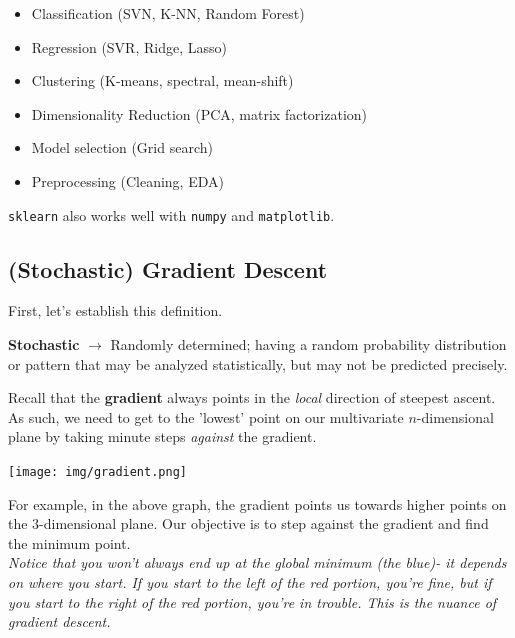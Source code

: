 \documentclass[english, 10pt]{article}
\begin{document}
\begin{itemize}
	\item Classification (SVN, K-NN, Random Forest)
	\item Regression (SVR, Ridge, Lasso)
	\item Clustering (K-means, spectral, mean-shift)
	\item Dimensionality Reduction (PCA, matrix factorization)
	\item Model selection (Grid search)
	\item Preprocessing (Cleaning, EDA)
\end{itemize}

\texttt{sklearn} also works well with \texttt{numpy} and \texttt{matplotlib}.

\subsection{(Stochastic) Gradient Descent}

First, let's establish this definition.\\

\begin{tcolorbox}[title=Definition:,colframe=red!75!black,colback=red!5!white,arc=0pt,fonttitle=\bfseries]
\textbf{Stochastic} $\rightarrow$ Randomly determined; having a random probability distribution or pattern that may be analyzed statistically, but may not be predicted precisely.
\end{tcolorbox}

\hfill \break Recall that the \textbf{gradient} always points in the \textit{local} direction of steepest ascent.\\

As such, we need to get to the 'lowest' point on our multivariate $n$-dimensional plane by taking minute steps \textit{against} the gradient.

\begin{center}
	\texttt{[image: img/gradient.png]} 
\end{center}

For example, in the above graph, the gradient points us towards higher points on the 3-dimensional plane. Our objective is to step against the gradient and find the minimum point.\\

\textit{Notice that you won't always end up at the global minimum (the blue)- it depends on where you start. If you start to the left of the red portion, you're fine, but if you start to the right of the red portion, you're in trouble. This is the nuance of gradient descent.}\\
\end{document}
